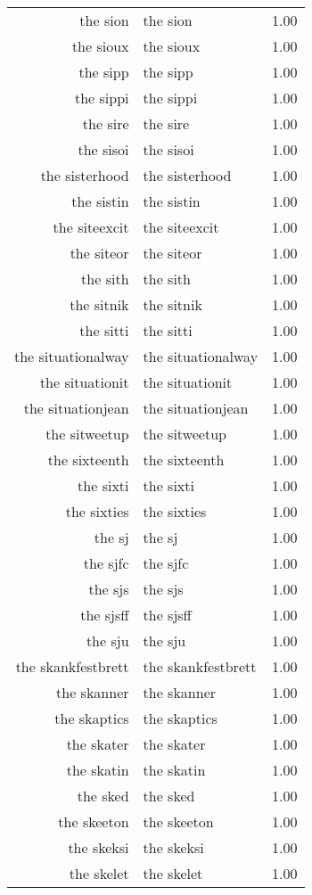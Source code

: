 \begin{table}[ht]
\begin{tabular}{rlr}
  the sion & the sion & 1.00 \\ 
  the sioux & the sioux & 1.00 \\ 
  the sipp & the sipp & 1.00 \\ 
  the sippi & the sippi & 1.00 \\ 
  the sire & the sire & 1.00 \\ 
  the sisoi & the sisoi & 1.00 \\ 
  the sisterhood & the sisterhood & 1.00 \\ 
  the sistin & the sistin & 1.00 \\ 
  the siteexcit & the siteexcit & 1.00 \\ 
  the siteor & the siteor & 1.00 \\ 
  the sith & the sith & 1.00 \\ 
  the sitnik & the sitnik & 1.00 \\ 
  the sitti & the sitti & 1.00 \\ 
  the situationalway & the situationalway & 1.00 \\ 
  the situationit & the situationit & 1.00 \\ 
  the situationjean & the situationjean & 1.00 \\ 
  the sitweetup & the sitweetup & 1.00 \\ 
  the sixteenth & the sixteenth & 1.00 \\ 
  the sixti & the sixti & 1.00 \\ 
  the sixties & the sixties & 1.00 \\ 
  the sj & the sj & 1.00 \\ 
  the sjfc & the sjfc & 1.00 \\ 
  the sjs & the sjs & 1.00 \\ 
  the sjsff & the sjsff & 1.00 \\ 
  the sju & the sju & 1.00 \\ 
  the skankfestbrett & the skankfestbrett & 1.00 \\ 
  the skanner & the skanner & 1.00 \\ 
  the skaptics & the skaptics & 1.00 \\ 
  the skater & the skater & 1.00 \\ 
  the skatin & the skatin & 1.00 \\ 
  the sked & the sked & 1.00 \\ 
  the skeeton & the skeeton & 1.00 \\ 
  the skeksi & the skeksi & 1.00 \\ 
  the skelet & the skelet & 1.00 \\ 

\end{tabular}
\end{table}
